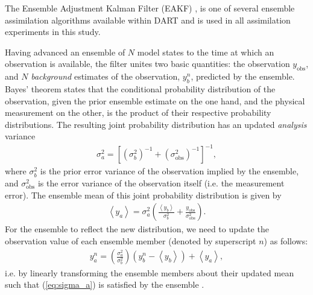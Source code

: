 The Ensemble Adjustment Kalman Filter (EAKF) \citep{anderson2001}, is one of several ensemble assimilation algorithms available within DART and is used in all assimilation experiments in this study. 

Having advanced an ensemble of $N$ model states to the time at which an observation is available, 
the filter unites two basic quantities: the observation $y_{\text{obs}}$, and $N$ \textit{background} estimates of the observation, $y_{b}^{n}$, predicted by the ensemble. 
Bayes' theorem states that the conditional probability distribution of the observation, given the prior ensemble estimate on the one hand, and the physical measurement on the other, is the product of their respective probability distributions.
The resulting joint probability distribution has an updated \textit{analysis} variance 
\begin{eqnarray}
 \sigma_a^2 = 
\left[
\left( \sigma_b^2  \right)^{-1}+
\left( \sigma_{\text{obs}}^2  \right)^{-1}
\right]^{-1},
\label{eq:sigma_a}
\end{eqnarray}
where $\sigma_b^2$ is  the prior error variance of the observation implied by the ensemble, and $\sigma_{\text{obs}}^2$ is the error variance of the observation itself (i.e. the measurement error).
The ensemble mean of this joint probability distribution is given by
\begin{eqnarray}
\left< y_a \right> = \sigma_a^2 
\left(
\frac{\left< y_b \right>}{\sigma_b^2} +
\frac{y_{\text{obs}} }{\sigma_{\text{obs}}^2} 
\right).
\label{eq:y_a}
\end{eqnarray}
For the ensemble to reflect the new distribution, we need to update the observation value of each ensemble member (denoted by superscript $n$) as follows:
\begin{eqnarray}
 y_{a}^n = 
\left( \frac{\sigma_a^2}{\sigma_b^2}  \right)
\left(
y_{b}^n - \left< y_b  \right> \right)
+ \left< y_a \right>,
\end{eqnarray}
i.e. by linearly transforming the ensemble members about their updated mean such that (\ref{eq:sigma_a}) is satisfied by the ensemble \citep{andersoncollins2006}.

